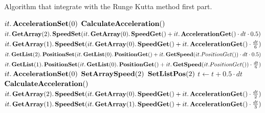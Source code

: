 \begin{algorithm}
\caption{Algorithm that integrate with the Runge Kutta method first part.}
\label{code:RungeKutta2p1}
\begin{algorithmic}[1]
            \State $it.\mathop{\textbf{AccelerationSet}}(0)$
\EndFor
	\State $\mathop{\textbf{CalculateAcceleration}}()$
            \State $it.\mathop{\textbf{GetArray}}(2).\mathop{\textbf{SpeedSet}}(it.\mathop{\textbf{GetArray}}(0).\mathop{\textbf{SpeedGet}}()+it.\mathop{\textbf{AccelerationGet}}()\cdot dt \cdot 0.5)$
            \State $it.\mathop{\textbf{GetArray}}(1).\mathop{\textbf{SpeedSet}}(it.\mathop{\textbf{GetArray}}(0).\mathop{\textbf{SpeedGet}}()+it.\mathop{\textbf{AccelerationGet}}()\cdot \frac{dt}{6})$
        \EndFor
            \State $it.\mathop{\textbf{GetList}}(2).\mathop{\textbf{PositionSet}}(it.\mathop{\textbf{GetList}}(0).\mathop{\textbf{PositionGet}}()+it.\mathop{\textbf{GetSpeed}}(it.PositionGet())\cdot dt \cdot 0.5)$
            \State $it.\mathop{\textbf{GetList}}(1).\mathop{\textbf{PositionSet}}(it.\mathop{\textbf{GetList}}(0).\mathop{\textbf{PositionGet}}()+it.\mathop{\textbf{GetSpeed}}(it.PositionGet())\cdot \frac{dt}{6})$
        \EndFor
            \State $it.\mathop{\textbf{AccelerationSet}}(0)$
        \EndFor
        \State $\mathop{\textbf{SetArraySpeed}}(2)$
        \State $\mathop{\textbf{SetListPos}}(2)$
        \State $t\gets t+0.5\cdot dt$
        \State $\mathop{\textbf{CalculateAcceleration}}()$
            \State $it.\mathop{\textbf{GetArray}}(2).\mathop{\textbf{SpeedSet}}(it.\mathop{\textbf{GetArray}}(0).\mathop{\textbf{SpeedGet}}()+it.\mathop{\textbf{AccelerationGet}}()\cdot \frac{dt}{2})$
            \State $it.\mathop{\textbf{GetArray}}(1).\mathop{\textbf{SpeedSet}}(it.\mathop{\textbf{GetArray}}(1).\mathop{\textbf{SpeedGet}}()+it.\mathop{\textbf{AccelerationGet}}()\cdot \frac{dt}{3})$

\end{algorithmic}
\end{algorithm}
